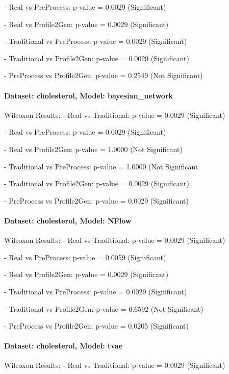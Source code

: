 \documentclass{article}
\theoremstyle{plain}
\theoremstyle{definition}
\theoremstyle{remark}
\begin{document}
- Real vs PreProcess: p-value = 0.0029 (Significant)


- Real vs Profile2Gen: p-value = 0.0029 (Significant)


- Traditional vs PreProcess: p-value = 0.0029 (Significant)


- Traditional vs Profile2Gen: p-value = 0.0029 (Significant)


- PreProcess vs Profile2Gen: p-value = 0.2549 (Not Significant)



\paragraph{Dataset: cholesterol, Model: bayesian\_network}
Wilcoxon Results:
- Real vs Traditional: p-value = 0.0029 (Significant)


- Real vs PreProcess: p-value = 0.0029 (Significant)


- Real vs Profile2Gen: p-value = 1.0000 (Not Significant)


- Traditional vs PreProcess: p-value = 1.0000 (Not Significant


- Traditional vs Profile2Gen: p-value = 0.0029 (Significant)


- PreProcess vs Profile2Gen: p-value = 0.0029 (Significant)



\paragraph{Dataset: cholesterol, Model: NFlow}
Wilcoxon Results:
- Real vs Traditional: p-value = 0.0029 (Significant)


- Real vs PreProcess: p-value = 0.0059 (Significant)


- Real vs Profile2Gen: p-value = 0.0029 (Significant)


- Traditional vs PreProcess: p-value = 0.0029 (Significant)


- Traditional vs Profile2Gen: p-value = 0.6592 (Not Significant)


- PreProcess vs Profile2Gen: p-value = 0.0205 (Significant)



\paragraph{Dataset: cholesterol, Model: tvae}
Wilcoxon Results:
- Real vs Traditional: p-value = 0.0029 (Significant)
\end{document}
